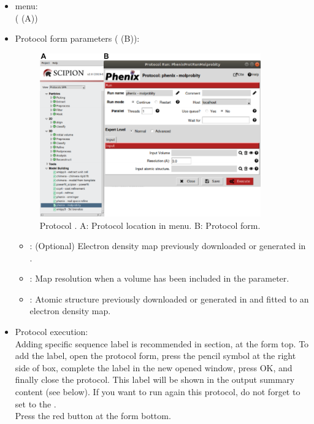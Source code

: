 \begin{itemize}
 \item \scipion menu:\\
   ( (A))\\
  
 \item Protocol form parameters ( (B)):\\
  
    \begin{figure}[H]
     \centering 
     \captionsetup{width=.7\linewidth} 
     \includegraphics[width=0.90\textwidth]{Images_appendix/Fig143.pdf}
     \caption{Protocol . A: Protocol location in \scipion menu. B: Protocol form.}
     \label{fig:app_protocol_molprobity_1}
    \end{figure}

    \begin{itemize}
     \item {}: (Optional) Electron density map previously downloaded or generated in \scipion.
     \item {}: Map resolution when a volume has been included in the  parameter.
     \item {}: Atomic structure previously downloaded or generated in \scipion and fitted to an electron density map.\
    \end{itemize}
    
 \item Protocol execution:\\
 Adding specific sequence label is recommended in  section, at the form top. To add the label, open the protocol form, press the pencil symbol at the right side of  box, complete the label in the new opened window, press OK, and finally close the protocol. This label will be shown in the output summary content (see below). If you want to run again this protocol, do not forget to set to  the .\\
  Press the \ttt{Execute} red button at the form bottom.\\
  

\end{itemize}
